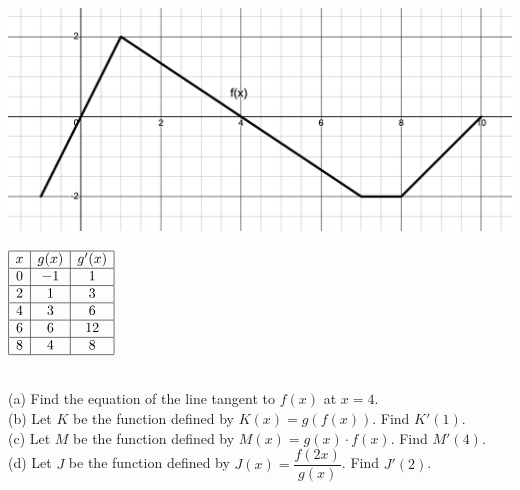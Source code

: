  \\
\begin{minipage}[t]{0.75\textwidth} \vspace{0pt}%
    \includegraphics[width = \textwidth]{Support/Chapter 1 Graphics/1.7-Graphic5.png}
\end{minipage} \hfill \begin{minipage}[t]{0.2\textwidth} \vspace{11pt}%
    \def\arraystretch{1.4}
    $\begin{array}{|c|c|c|}
        \hline
        x & g(x) & g'(x) \\ \hline
        0 & -1 & 1 \\ \hline
        2 & 1 & 3 \\ \hline
        4 & 3 & 6 \\ \hline
        6 & 6 & 12 \\ \hline
        8 & 4 & 8 \\
        \hline
    \end{array}$
\end{minipage} \\

(a) Find the equation of the line tangent to $f(x)$ at $x = 4$. \\[11pt]
(b) Let $K$ be the function defined by $K(x) = g(f(x))$. Find $K'(1)$. \\[11pt]
(c) Let $M$ be the function defined by $M(x) = g(x) \cdot f(x)$. Find $M'(4)$. \\[11pt]
(d) Let $J$ be the function defined by $J(x) = \dfrac{f(2x)}{g(x)}$. Find $J'(2)$. \\[11pt]

